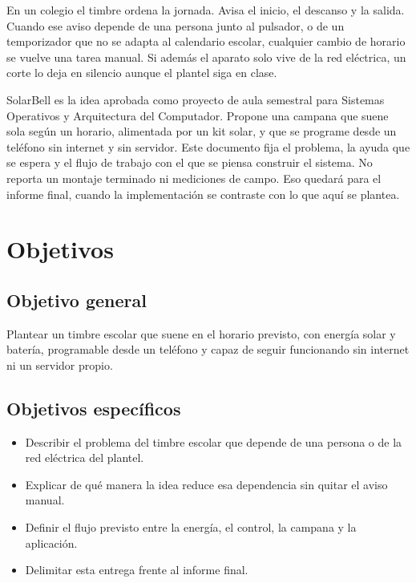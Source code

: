 \documentclass[12pt,letterpaper]{article}
\begin{document}
En un colegio el timbre ordena la jornada. Avisa el inicio, el descanso y la salida. Cuando ese aviso depende de una persona junto al pulsador, o de un temporizador que no se adapta al calendario escolar, cualquier cambio de horario se vuelve una tarea manual. Si además el aparato solo vive de la red eléctrica, un corte lo deja en silencio aunque el plantel siga en clase.

SolarBell es la idea aprobada como proyecto de aula semestral para Sistemas Operativos y Arquitectura del Computador. Propone una campana que suene sola según un horario, alimentada por un kit solar, y que se programe desde un teléfono sin internet y sin servidor. Este documento fija el problema, la ayuda que se espera y el flujo de trabajo con el que se piensa construir el sistema. No reporta un montaje terminado ni mediciones de campo. Eso quedará para el informe final, cuando la implementación se contraste con lo que aquí se plantea.

\section*{Objetivos}

\subsection*{Objetivo general}

Plantear un timbre escolar que suene en el horario previsto, con energía solar y batería, programable desde un teléfono y capaz de seguir funcionando sin internet ni un servidor propio.

\subsection*{Objetivos específicos}

\begin{itemize}
    \item Describir el problema del timbre escolar que depende de una persona o de la red eléctrica del plantel.
    \item Explicar de qué manera la idea reduce esa dependencia sin quitar el aviso manual.
    \item Definir el flujo previsto entre la energía, el control, la campana y la aplicación.
    \item Delimitar esta entrega frente al informe final.
\end{itemize}
\end{document}
